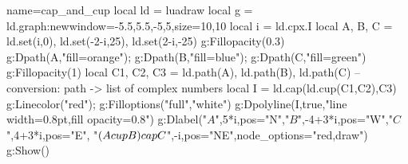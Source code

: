 \begin{luadraw}{name=cap_and_cup}
local ld = luadraw
local g = ld.graph:new{window={-5.5,5.5,-5,5},size={10,10}}
local i = ld.cpx.I
local A, B, C = ld.set(i,0), ld.set(-2-i,25), ld.set(2-i,-25)
g:Fillopacity(0.3)
g:Dpath(A,"fill=orange"); g:Dpath(B,"fill=blue"); g:Dpath(C,"fill=green")
g:Fillopacity(1)
local C1, C2, C3 = ld.path(A), ld.path(B), ld.path(C) -- conversion: path -> list of complex numbers
local I = ld.cap(ld.cup(C1,C2),C3)
g:Linecolor("red"); g:Filloptions("full","white")
g:Dpolyline(I,true,"line width=0.8pt,fill opacity=0.8")
g:Dlabel("$A$",5*i,{pos="N"},"$B$",-4+3*i,{pos="W"},"$C$",4+3*i,{pos="E"},
"$(A\\cup B) \\cap C$",-i,{pos="NE",node_options="red,draw"})
g:Show()
\end{luadraw}
